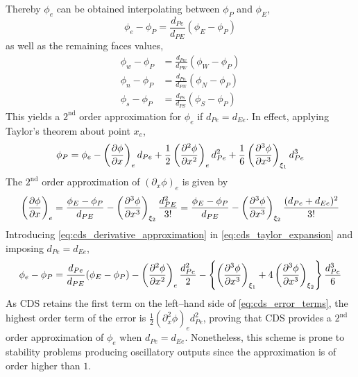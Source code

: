 \noindent
Thereby $\phi_e$ can be obtained interpolating between $\phi_P$ and $\phi_E$,
\begin{equation} \label{eq:cds_e}
	\phi_e - \phi_P = \frac{d_{Pe}}{d_{PE}} (\phi_E - \phi_P)
\end{equation}
as well as the remaining faces values,
\begin{align}
	\phi_w - \phi_P &= \frac{d_{Pw}}{d_{PW}} (\phi_W - \phi_P) \\
	\phi_n - \phi_P &= \frac{d_{Pn}}{d_{PN}} (\phi_N - \phi_P) \\
	\phi_s - \phi_P &= \frac{d_{Ps}}{d_{PS}} (\phi_S - \phi_P) \label{eq:cds_s}
\end{align}
This yields a $2^{\text{nd}}$ order approximation for $\phi_e$ if $d_{Pe} =
d_{Ee}$. In effect, applying Taylor's theorem about point $x_e$,
\begin{equation} \label{eq:cds_taylor_expansion}
	\phi_P = 
	\phi_e 
	- \left(\pdv{\phi}{x}\right)_e d_{Pe} 
	+ \frac{1}{2} \left(\pdv[2]{\phi}{x}\right)_e d_{Pe}^2 
	+ \frac{1}{6} \left(\pdv[3]{\phi}{x}\right)_{\xi_1} d_{Pe}^3
\end{equation}
The $2^\text{nd}$ order approximation of $(\partial_x \phi)_e$ is given by
\begin{equation} \label{eq:cds_derivative_approximation}
	\left(\pdv{\phi}{x}\right)_e = 
	\frac{\phi_E - \phi_P}{d_{PE}} - \left(\pdv[3]{\phi}{x}\right)_{\xi_2} \frac{d_{PE}^2}{3!} = 	
	\frac{\phi_E - \phi_P}{d_{PE}} - \left(\pdv[3]{\phi}{x}\right)_{\xi_2} \frac{(d_{Pe} + d_{Ee})^2}{3!}
\end{equation}
Introducing \eqref{eq:cds_derivative_approximation} in
\eqref{eq:cds_taylor_expansion} and imposing $d_{Pe} = d_{Ee}$, 
\begin{equation} \label{eq:cds_error_terms}
	\phi_e - \phi_P = 
	\frac{d_{Pe}}{d_{PE}} (\phi_E - \phi_P) - 
	\left( \pdv[2]{\phi}{x} \right)_e \frac{d_{Pe}^2}{2} -
	\left\{ 
	\left( \pdv[3]{\phi}{x} \right)_{\xi_1} + 4 \left( \pdv[3]{\phi}{x} \right)_{\xi_2}
	\right\} 
	\frac{d_{Pe}^3}{6}
\end{equation}
As CDS retains the first term on the left--hand side of
\eqref{eq:cds_error_terms}, the highest order term of the error is $\frac{1}{2}
(\partial_x^2 \phi)_e d_{Pe}^2$, proving that CDS provides a $2^\text{nd}$ order
approximation of $\phi_e$ when $d_{Pe} = d_{Ee}$. Nonetheless, this scheme is
prone to stability problems producing oscillatory outputs since the
approximation is of order higher than $1$.